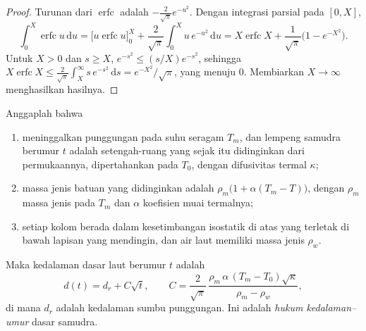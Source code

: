 \begin{proof}
Turunan dari $\operatorname{erfc}$ adalah $-\frac{2}{\sqrt\pi}e^{-u^2}$.
Dengan integrasi parsial pada $[0, X]$,
\[
  \int_0^X \operatorname{erfc} u\,\mathrm du
  = \bigl[u \operatorname{erfc} u\bigr]_0^X + \frac{2}{\sqrt\pi}\int_0^X u\,e^{-u^2}\,\mathrm du
  = X\operatorname{erfc} X + \frac{1}{\sqrt\pi}\bigl(1 - e^{-X^2}\bigr).
\]
Untuk $X > 0$ dan $s \ge X$, $e^{-s^2} \le (s/X)e^{-s^2}$, sehingga
$X\operatorname{erfc} X \le \frac{2}{\sqrt\pi}\int_X^\infty s\,e^{-s^2}\,\mathrm ds
= e^{-X^2}/\sqrt\pi$, yang menuju 0. Membiarkan $X \to \infty$ menghasilkan hasilnya.
\end{proof}

\begin{theorem}\label{thm:b1:rifts-ridges-margins:depth-age}
Anggaplah bahwa
\begin{enumerate}
  \item {} meninggalkan punggungan pada suhu seragam $T_m$, dan lempeng samudra
        berumur $t$ adalah setengah-ruang yang sejak itu didinginkan dari
        permukaannya, dipertahankan pada $T_0$, dengan difusivitas termal $\kappa$;
  \item massa jenis batuan yang didinginkan adalah $\rho_m\bigl(1 + \alpha(T_m -
        T)\bigr)$, dengan $\rho_m$ massa jenis  pada $T_m$ dan
        $\alpha$ koefisien muai termalnya;
  \item setiap kolom berada dalam kesetimbangan isostatik di atas  yang terletak di bawah lapisan yang mendingin, dan air laut
        memiliki massa jenis $\rho_w$.
\end{enumerate}
Maka kedalaman dasar laut berumur $t$ adalah
\[
  d(t) = d_r + C\sqrt t, \qquad
  C = \frac{2}{\sqrt\pi}\,\frac{\rho_m\,\alpha\,(T_m - T_0)\sqrt\kappa}{\rho_m - \rho_w},
\]
di mana $d_r$ adalah kedalaman sumbu punggungan. Ini adalah
\emph{hukum kedalaman--umur} dasar samudra.
\end{theorem}

